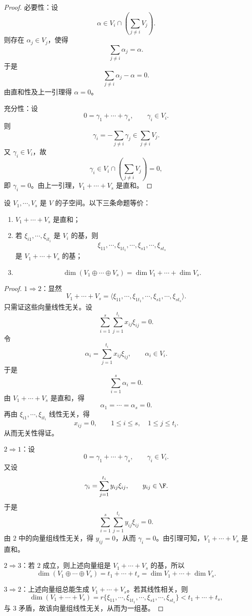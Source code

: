 \begin{proof}
	必要性：设
	\[
	\alpha\in V_i\cap\left(\sum_{j\neq i}V_j\right).
	\]
	则存在 $\alpha_j\in V_j$，使得
	\[
	\sum_{j\neq i}\alpha_j=\alpha.
	\]
	于是
	\[
	\sum_{j\neq i}\alpha_j-\alpha=0.
	\]
	由直和性及上一引理得 $\alpha=0$。
	
	充分性：设
	\[
	0=\gamma_1+\cdots+\gamma_s,
	\qquad
	\gamma_i\in V_i.
	\]
	则
	\[
	\gamma_i=-\sum_{j\neq i}\gamma_j\in\sum_{j\neq i}V_j.
	\]
	又 $\gamma_i\in V_i$，故
	\[
	\gamma_i\in V_i\cap\left(\sum_{j\neq i}V_j\right)=0,
	\]
	即 $\gamma_i=0$。由上一引理，$V_1+\cdots+V_s$ 是直和。
\end{proof}

\begin{proposition}
	设 $V_1,\cdots,V_s$ 是 $V$ 的子空间。以下三条命题等价：
	\begin{enumerate}
		\item $V_1+\cdots+V_s$ 是直和；
		\item 若 $\xi_{i1},\cdots,\xi_{it_i}$ 是 $V_i$ 的基，则
		\[
		\xi_{11},\cdots,\xi_{1t_1},
		\cdots,
		\xi_{s1},\cdots,\xi_{st_s}
		\]
		是 $V_1+\cdots+V_s$ 的基；
		\item
		\[
		\dim(V_1\oplus\cdots\oplus V_s)
		=\dim V_1+\cdots+\dim V_s.
		\]
	\end{enumerate}
\end{proposition}

\begin{proof}
	$1\Rightarrow 2$：显然
	\[
	V_1+\cdots+V_s
	=
	\langle \xi_{11},\cdots,\xi_{1t_1},
	\cdots,
	\xi_{s1},\cdots,\xi_{st_s}\rangle.
	\]
	只需证这些向量线性无关。设
	\[
	\sum_{i=1}^{s}\sum_{j=1}^{t_i}x_{ij}\xi_{ij}=0.
	\]
	令
	\[
	\alpha_i=\sum_{j=1}^{t_i}x_{ij}\xi_{ij},
	\qquad
	\alpha_i\in V_i.
	\]
	于是
	\[
	\sum_{i=1}^{s}\alpha_i=0.
	\]
	由 $V_1+\cdots+V_s$ 是直和，得
	\[
	\alpha_1=\cdots=\alpha_s=0.
	\]
	再由 $\xi_{i1},\cdots,\xi_{it_i}$ 线性无关，得
	\[
	x_{ij}=0,
	\qquad
	1\leq i\leq s,
	\quad
	1\leq j\leq t_i.
	\]
	从而无关性得证。
	
	$2\Rightarrow 1$：设
	\[
	0=\gamma_1+\cdots+\gamma_s,
	\qquad
	\gamma_i\in V_i.
	\]
	又设
	\[
	\gamma_i=\sum_{j=1}^{t_i}y_{ij}\xi_{ij},
	\qquad
	y_{ij}\in\F.
	\]
	于是
	\[
	\sum_{i=1}^{s}\sum_{j=1}^{t_i}y_{ij}\xi_{ij}=0.
	\]
	由 $2$ 中的向量组线性无关，得 $y_{ij}=0$，从而 $\gamma_i=0$。由引理可知，$V_1+\cdots+V_s$ 是直和。
	
	$2\Rightarrow 3$：若 $2$ 成立，则上述向量组是 $V_1+\cdots+V_s$ 的基，所以
	\[
	\dim(V_1\oplus\cdots\oplus V_s)
	=t_1+\cdots+t_s
	=\dim V_1+\cdots+\dim V_s.
	\]
	
	$3\Rightarrow 2$：上述向量组总能生成 $V_1+\cdots+V_s$。若其线性相关，则
	\[
	\dim(V_1+\cdots+V_s)
	=
	r\{\xi_{11},\cdots,\xi_{1t_1},\cdots,\xi_{s1},\cdots,\xi_{st_s}\}
	<t_1+\cdots+t_s,
	\]
	与 $3$ 矛盾，故该向量组线性无关，从而为一组基。
\end{proof}

